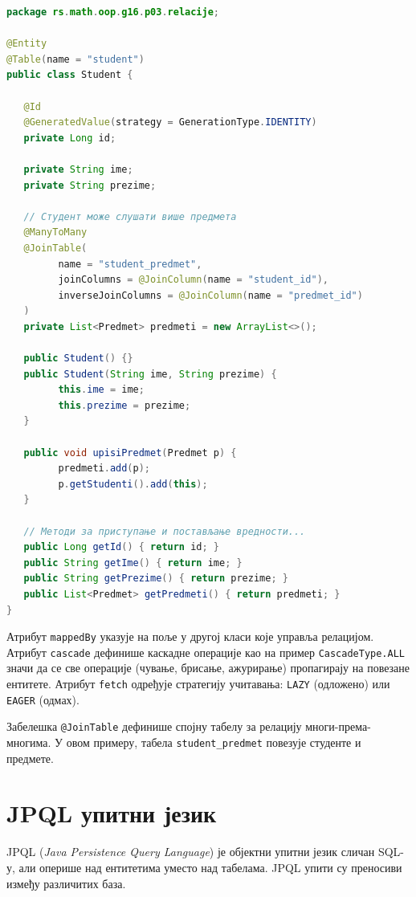 \begin{lstlisting}[language=Java]
package rs.math.oop.g16.p03.relacije;
 
@Entity
@Table(name = "student")
public class Student {
 
   @Id
   @GeneratedValue(strategy = GenerationType.IDENTITY)
   private Long id;
 
   private String ime;
   private String prezime;
 
   // Студент може слушати више предмета
   @ManyToMany
   @JoinTable(
         name = "student_predmet",
         joinColumns = @JoinColumn(name = "student_id"),
         inverseJoinColumns = @JoinColumn(name = "predmet_id")
   )
   private List<Predmet> predmeti = new ArrayList<>();
 
   public Student() {}
   public Student(String ime, String prezime) {
         this.ime = ime;
         this.prezime = prezime;
   }
 
   public void upisiPredmet(Predmet p) {
         predmeti.add(p);
         p.getStudenti().add(this);
   }
 
   // Методи за приступање и постављање вредности...
   public Long getId() { return id; }
   public String getIme() { return ime; }
   public String getPrezime() { return prezime; }
   public List<Predmet> getPredmeti() { return predmeti; }
}
\end{lstlisting}


Атрибут \texttt{mappedBy} указује на поље у другој класи које управља релацијом. Атрибут \texttt{cascade} дефинише каскадне операције као на пример \texttt{CascadeType.ALL} значи да се све операције (чување, брисање, ажурирање) пропагирају на повезане ентитете. Атрибут \texttt{fetch} одређује стратегију учитавања: \texttt{LAZY} (одложено) или \texttt{EAGER} (одмах).

Забелешка \texttt{@JoinTable} дефинише спојну табелу за релацију многи-према-многима. У овом примеру, табела \texttt{student\_predmet} повезује студенте и предмете.


\section{JPQL упитни језик}

JPQL (\textit{Java Persistence Query Language}) је објектни упитни језик сличан SQL-у, али оперише над ентитетима уместо над табелама. JPQL упити су преносиви између различитих база.


\bigskip

